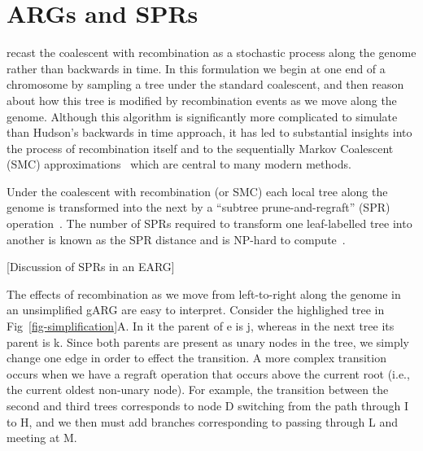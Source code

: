 \documentclass{article}
\begin{document}
\section*{ARGs and SPRs}
\citet{wiuf1999ancestry,wiuf1999recombination} recast
the coalescent with recombination
as a stochastic process along the genome rather than backwards in time.
In this formulation we begin at one end of a chromosome by
sampling a tree under the standard coalescent, and then reason
about how this tree is modified by recombination events
as we move along the genome. Although this algorithm is
significantly more complicated to simulate than Hudson's
backwards in time approach, it has led to substantial
insights into the process of recombination itself
and to the sequentially Markov Coalescent (SMC)
approximations~\citep{mcvean2005approximating,marjoram2006fast}
which are central to many modern methods.

Under the coalescent with recombination (or SMC) each local
tree along the genome is transformed into the next by
a ``subtree prune-and-regraft'' (SPR)
operation~\citep{hein1990reconstructing,song2003on,song2006properties}.
The number of SPRs required to transform one leaf-labelled tree
into another is known as the SPR distance
and is NP-hard to
compute~\citep{hein1996complexity,allen2001subtree,bordewich2005computational}.

[Discussion of SPRs in an EARG]

The effects of recombination as we move from left-to-right along
the genome in an unsimplified gARG are easy to interpret.
Consider the highlighed tree in Fig~\ref{fig-simplification}A.
In it the parent of \textsf{e} is \textsf{j}, whereas in the next tree
its parent is \textsf{k}. Since both parents are present as
unary nodes in the tree, we simply change one edge in
order to effect the transition.
A more complex transition occurs when we have a regraft operation
that occurs above the current root (i.e., the current oldest
non-unary node). For example, the transition between the
second and third trees corresponds to node D switching
from the path through I to H, and we then must add branches
corresponding to passing through L and meeting at M.
\end{document}
